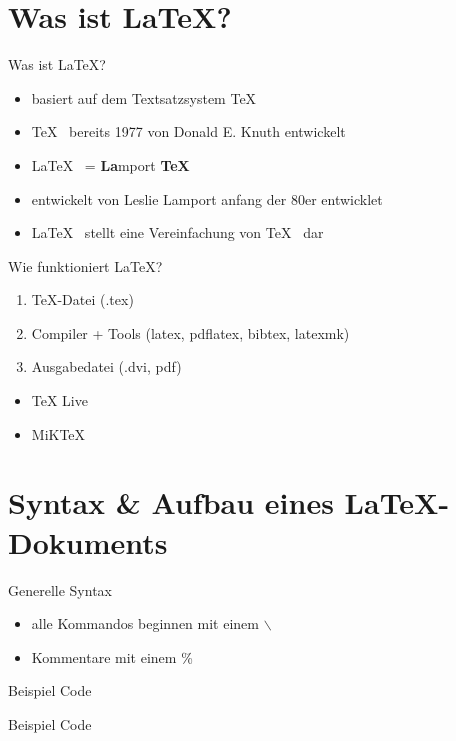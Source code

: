 
\section{Was ist \LaTeX ?}

\begin{frame}{Was ist \LaTeX ?}
	\begin{itemize}[<+->]
	\item basiert auf dem Textsatzsystem \TeX
	\item \TeX \mbox{ } bereits 1977 von Donald E. Knuth entwickelt
	\item \LaTeX \mbox{ } = \textbf{La}mport \textbf{TeX}
	\item entwickelt von Leslie Lamport anfang der 80er entwicklet
	\item \LaTeX \mbox{ } stellt eine Vereinfachung von \TeX \mbox{ } dar
	\end{itemize}
\end{frame}

\begin{frame}{Wie funktioniert \LaTeX?}
	\begin{enumerate}[<+->]
	\item \TeX -Datei (.tex)
	\item Compiler + Tools (latex, pdflatex, bibtex, latexmk)
	\item Ausgabedatei (.dvi, pdf)
	\end{enumerate}

	\begin{itemize}[<+->]
	\item TeX Live
	\item MiKTeX
	\end{itemize}
\end{frame}

\section{Syntax \& Aufbau eines \LaTeX -Dokuments}

\begin{frame}{Generelle Syntax}
	\begin{itemize}[<+->]
		\item alle Kommandos beginnen mit einem $\backslash$
		\item Kommentare mit einem \%
	\end{itemize}
\end{frame}
\begin{frame}{Beispiel Code}
	\begin{Code}
		
	\end{Code}

\end{frame}
\begin{frame}{Beispiel Code}
	\begin{Code}
		
	\end{Code}

\end{frame}

